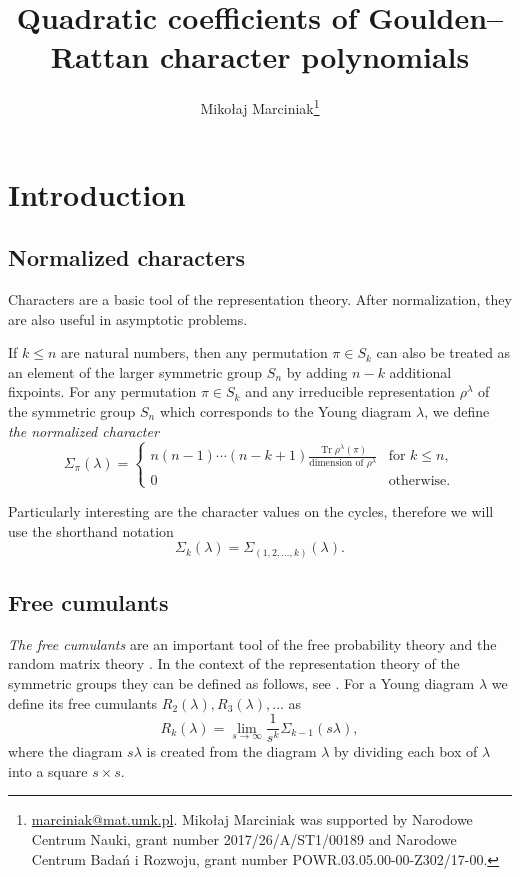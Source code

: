 \documentclass[submission]{FPSAC2021}
\title{Quadratic coefficients of Goulden--Rattan character polynomials}
\author[Mikołaj Marciniak]{Mikołaj Marciniak\thanks{\href{mailto:marciniak@mat.umk.pl}{marciniak@mat.umk.pl}. Mikołaj Marciniak was supported by Narodowe Centrum Nauki, grant number 2017/26/A/ST1/00189 and Narodowe Centrum Badań i Rozwoju, grant number POWR.03.05.00-00-Z302/17-00.}\addressmark{1}}
\begin{document}
\maketitle

\section{Introduction}

\subsection{Normalized characters}

Characters are a basic tool of the representation
theory. After normalization, they are also
useful in asymptotic problems.

If $k\leq n$ are natural numbers, then any
permutation $\pi \in S_k$ can also be treated 
as an element of the larger symmetric group 
$S_n$ by adding $n-k$ additional fixpoints. 
For any permutation $\pi \in S_k$ and any
irreducible representation $\rho^{\lambda}$ 
of the symmetric group $S_n$ which corresponds 
to the Young diagram $\lambda$, we define 
\emph{the normalized character}
$$
\Sigma_{\pi}(\lambda)
= \begin{cases} 
          n(n-1)\cdots(n-k+1)\frac{\operatorname{Tr}\rho^{\lambda}(\pi)}{\text{dimension of }\rho^{\lambda}} & \text{for } k \leq n,\\
          0 & \text{otherwise.}
\end{cases}
$$

Particularly interesting are the character
values on the cycles, therefore we
will use the shorthand notation
$$\Sigma_{k}(\lambda)=\Sigma_{(1,2,\ldots,k)}(\lambda).$$


\subsection{Free cumulants}

\emph{The free cumulants} are an important tool
of the free probability theory \cite{VDN92} and
the random matrix theory \cite{Voi91}. In the
context of the representation theory of the
symmetric groups they can be defined as follows,
see \cite{Bia03}. For a Young diagram $\lambda$
we define its free cumulants 
$R_2(\lambda), R_3(\lambda), \ldots$ as
$$R_k(\lambda)=\lim_{s\to\infty} \frac{1}{s^k}\Sigma_{k-1}(s\lambda),$$
where the diagram $s\lambda$ is created from 
the diagram $\lambda$ by dividing each box 
of $\lambda$ into a square $s\times s$. 
\end{document}
